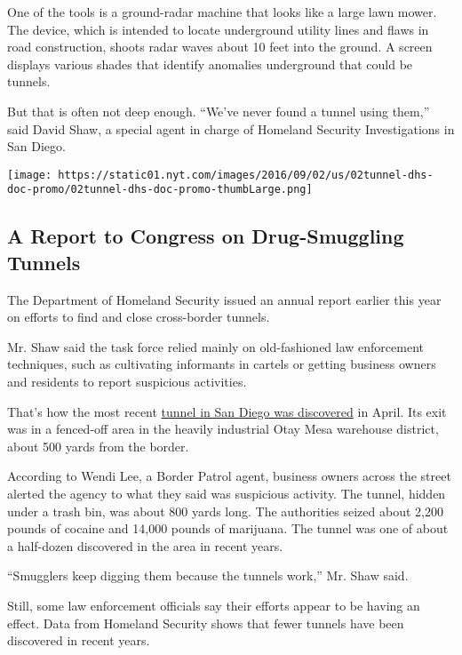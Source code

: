 One of the tools is a ground-radar machine that looks like a large lawn
mower. The device, which is intended to locate underground utility lines
and flaws in road construction, shoots radar waves about 10 feet into
the ground. A screen displays various shades that identify anomalies
underground that could be tunnels.

But that is often not deep enough. ``We've never found a tunnel using
them,'' said David Shaw, a special agent in charge of Homeland Security
Investigations in San Diego.

\href{https://www.nytimes.com/interactive/2016/09/01/us/document-DHS-Report-to-Congress-on-Cross-Broder-Tunnels.html}{}

\texttt{[image: https://static01.nyt.com/images/2016/09/02/us/02tunnel-dhs-doc-promo/02tunnel-dhs-doc-promo-thumbLarge.png]}

\hypertarget{a-report-to-congress-on-drug-smuggling-tunnels}{%
\subsection{A Report to Congress on Drug-Smuggling
Tunnels}\label{a-report-to-congress-on-drug-smuggling-tunnels}}

The Department of Homeland Security issued an annual report earlier this
year on efforts to find and close cross-border tunnels.

Mr. Shaw said the task force relied mainly on old-fashioned law
enforcement techniques, such as cultivating informants in cartels or
getting business owners and residents to report suspicious activities.

That's how the most recent
\href{http://www.nytimes.com/2016/04/22/us/drug-smuggling-tunnel-from-tijuana-mexico-found-in-san-diego.html?_r=0}{tunnel
in San Diego was discovered} in April. Its exit was in a fenced-off area
in the heavily industrial Otay Mesa warehouse district, about 500 yards
from the border.

According to Wendi Lee, a Border Patrol agent, business owners across
the street alerted the agency to what they said was suspicious activity.
The tunnel, hidden under a trash bin, was about 800 yards long. The
authorities seized about 2,200 pounds of cocaine and 14,000 pounds of
marijuana. The tunnel was one of about a half-dozen discovered in the
area in recent years.

``Smugglers keep digging them because the tunnels work,'' Mr. Shaw said.

Still, some law enforcement officials say their efforts appear to be
having an effect. Data from Homeland Security shows that fewer tunnels
have been discovered in recent years.

